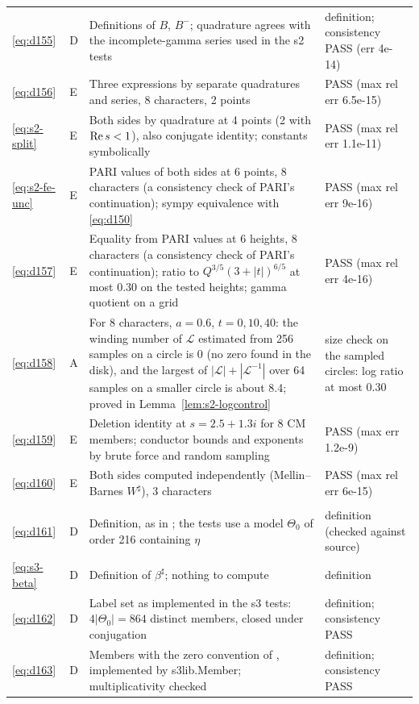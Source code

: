 \documentclass[11pt]{article}
\numberwithin{equation}{section}
\begin{document}
\begin{longtable}{@{}>{\raggedright\arraybackslash}p{1.2cm}>{\centering\arraybackslash}p{0.7cm}>{\raggedright\arraybackslash}p{9.05cm}>{\raggedright\arraybackslash}p{4.3cm}@{}}
\eqref{eq:d155} & D & Definitions of $B$, $B^-$; quadrature agrees with the incomplete-gamma series used in the s2 tests & definition; consistency PASS (err 4e-14)\\
\eqref{eq:d156} & E & Three expressions by separate quadratures and series, 8 characters, 2 points & PASS (max rel err 6.5e-15)\\
\eqref{eq:s2-split} & E & Both sides by quadrature at 4 points (2 with ${\rm Re}\,s<1$), also conjugate identity; constants symbolically & PASS (max rel err 1.1e-11)\\
\eqref{eq:s2-fe-unc} & E & PARI values of both sides at 6 points, 8 characters (a consistency check of PARI's continuation); sympy equivalence with \eqref{eq:d150} & PASS (max rel err 9e-16)\\
\eqref{eq:d157} & E & Equality from PARI values at 6 heights, 8 characters (a consistency check of PARI's continuation); ratio to $Q^{3/5}(3+|t|)^{6/5}$ at most 0.30 on the tested heights; gamma quotient on a grid & PASS (max rel err 4e-16)\\
\eqref{eq:d158} & A & For 8 characters, $a=0.6$, $t=0,10,40$: the winding number of $\mathcal L$ estimated from 256 samples on a circle is 0 (no zero found in the disk), and the largest of $|\mathcal L|+|\mathcal L^{-1}|$ over 64 samples on a smaller circle is about 8.4; proved in Lemma~\ref{lem:s2-logcontrol} & size check on the sampled circles: log ratio at most 0.30\\
\eqref{eq:d159} & E & Deletion identity at $s=2.5+1.3i$ for 8 CM members; conductor bounds and exponents by brute force and random sampling & PASS (max err 1.2e-9)\\
\eqref{eq:d160} & E & Both sides computed independently (Mellin--Barnes $W^\sharp$), 3 characters & PASS (max rel err 6e-15)\\
\multicolumn{4}{@{}l}{\emph{Appendix~D}}\\
\eqref{eq:d161} & D & Definition, as in \cite{OAI78}; the tests use a model $\Theta_0$ of order 216 containing $\eta$ & definition (checked against source)\\
\eqref{eq:s3-beta} & D & Definition of $\beta^\sharp$; nothing to compute & definition\\
\eqref{eq:d162} & D & Label set as implemented in the s3 tests: $4|\Theta_0|=864$ distinct members, closed under conjugation & definition; consistency PASS\\
\eqref{eq:d163} & D & Members with the zero convention of \cite{OAI78}, implemented by s3lib.Member; multiplicativity checked & definition; consistency PASS\\

\end{longtable}
\end{document}
